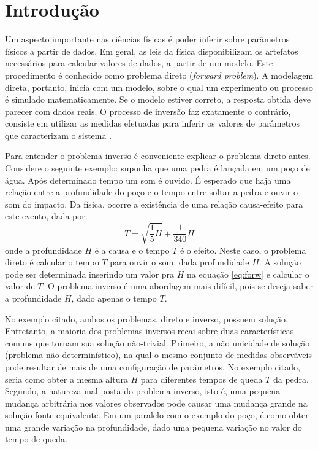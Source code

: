 \chapter{Introdução}
\label{cap:1intro}
% 
Um aspecto importante nas ciências físicas é poder inferir sobre parâmetros
físicos a partir de dados. Em geral, as leis da física disponibilizam os
artefatos necessários para calcular valores de dados, a partir de um modelo.
Este procedimento é conhecido como problema direto (\textit{forward problem}).
A modelagem direta, portanto, inicia com um modelo, sobre o qual um experimento ou processo
é simulado matematicamente. Se o modelo estiver correto, a resposta
obtida deve parecer com dados reais. O processo de inversão faz exatamente o contrário,
consiste em utilizar as medidas efetuadas para inferir os valores de parâmetros que
caracterizam o sistema \citep{tarantola}.

Para entender o problema inverso é conveniente explicar o problema direto antes.
Considere o seguinte exemplo: suponha que uma pedra é lançada em um poço de água.
Após determinado tempo um som é ouvido. É esperado que haja uma relação entre a
profundidade do poço e o tempo entre soltar a pedra e ouvir o som do impacto. Da física,
ocorre a existência de uma relação causa-efeito para este evento, dada por:
\begin{equation}
\label{eq:forw}
T = \sqrt{\frac{1}{5}H} + \frac{1}{340}H
\end{equation}
onde a profundidade $H$ é a causa e o tempo $T$ é o efeito.
Neste caso, o problema direto é calcular o tempo $T$ para ouvir o som, dada profundidade $H$.
A solução pode ser determinada inserindo um valor pra $H$ na equação \ref{eq:forw} e calcular o
valor de $T$. O problema inverso é uma abordagem mais difícil, pois se deseja
saber a profundidade $H$, dado apenas o tempo $T$.

No exemplo citado, ambos os problemas, direto e inverso, possuem solução. Entretanto,
a maioria dos problemas inversos recai sobre duas características
comuns que tornam sua solução não-trivial. Primeiro, a não unicidade de solução
(problema não-determinístico), na qual o mesmo conjunto de medidas
observáveis pode resultar de mais de uma configuração de parâmetros. No exemplo
citado, seria como obter a mesma altura $H$ para diferentes tempos
de queda $T$ da pedra. Segundo, a natureza mal-posta do problema inverso, isto é,
uma pequena mudança arbitrária nos valores observados pode causar uma mudança grande
na solução fonte equivalente. Em um paralelo com o exemplo do poço, é como
obter uma grande variação na profundidade, dado uma pequena variação no valor do tempo de queda.

